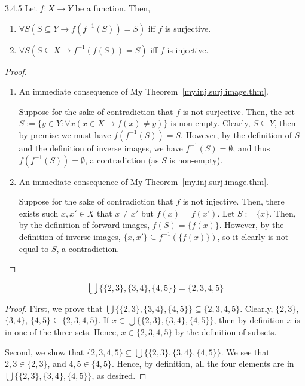 \begin{exercise}{3.4.5}
	Let $f: X \to Y$ be a function. Then,
	\begin{enumerate}
		\item $\forall S(S \subseteq Y \to f(f^{-1}(S)) = S)$ iff $f$ is surjective.
		\item $\forall S(S \subseteq X \to f^{-1}(f(S)) = S)$ iff $f$ is injective.
	\end{enumerate}
\end{exercise}
\begin{proof}\leavevmode
	\begin{enumerate}
		\item \myifbox An immediate consequence of My Theorem~\ref{my.inj.surj.image.thm}.
		
		\myoifbox Suppose for the sake of contradiction that $f$ is not surjective. Then, the set 
		$S := \{y \in Y: \forall x(x \in X \to f(x) \ne y)\}$ is non-empty. Clearly, $S \subseteq Y$, then by premise we must have $f(f^{-1}(S)) = S$. However, by the definition of $S$ and the definition of inverse images, we have $f^{-1}(S) = \emptyset$, and thus $f(f^{-1}(S)) = \emptyset$, a contradiction (as $S$ is non-empty).
		
		\item \myifbox An immediate consequence of My Theorem~\ref{my.inj.surj.image.thm}.
		
		\myoifbox Suppose for the sake of contradiction that $f$ is not injective. Then, there exists such $x,x' \in X$ that $x \ne x'$ but $f(x) = f(x')$. Let $S := \{x\}$. Then, by the definition of forward images, $f(S) = \{f(x)\}$. However, by the definition of inverse images, $\{x,x'\} \subseteq f^{-1}(\{f(x)\})$, so it clearly is not equal to $S$, a contradiction.
	\end{enumerate}
\end{proof}

\begin{why}{50}
	\[
		\bigcup \{\{2,3\},\{3,4\},\{4,5\}\} = \{2,3,4,5\}
	\]
\end{why}
\begin{proof}
	First, we prove that $\bigcup \{\{2,3\},\{3,4\},\{4,5\}\} \subseteq \{2,3,4,5\}$. Clearly, $\{2,3\}$, $\{3,4\}$, $\{4,5\} \subseteq \{2,3,4,5\}$. If $x \in \bigcup \{\{2,3\},\{3,4\},\{4,5\}\}$, then by definition $x$ is in one of the three sets. Hence, $x \in \{2,3,4,5\}$ by the definition of subsets.
	
	Second, we show that $\{2,3,4,5\} \subseteq \bigcup \{\{2,3\},\{3,4\},\{4,5\}\}$. We see that $2,3 \in \{2,3\}$, and $4,5 \in \{4,5\}$. Hence, by definition, all the four elements are in $\bigcup \{\{2,3\},\{3,4\},\{4,5\}\}$, as desired.
\end{proof}

